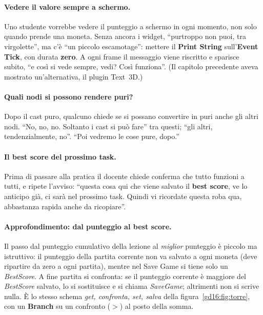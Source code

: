 \paragraph{Vedere il valore sempre a schermo.} Uno studente vorrebbe vedere il
punteggio a schermo in ogni momento, non solo quando prende una moneta. Senza
ancora i widget, ``purtroppo non puoi, tra virgolette'', ma c'è ``un piccolo
escamotage'': mettere il \textbf{Print String} sull'\textbf{Event Tick}, con
durata \textbf{zero}. A ogni frame il messaggio viene riscritto e sparisce
subito, ``e così si vede sempre, vedi? Così funziona''. (Il capitolo
precedente aveva mostrato un'alternativa, il plugin Text~3D.)

\paragraph{Quali nodi si possono rendere puri?} Dopo il cast puro, qualcuno
chiede se si possano convertire in puri anche gli altri nodi. ``No, no, no.
Soltanto i cast si può fare'' tra questi; ``gli altri, tendenzialmente, no''.
``Poi vedremo le cose pure, dopo.''

\paragraph{Il best score del prossimo task.} Prima di passare alla pratica il
docente chiede conferma che tutto funzioni a tutti, e ripete l'avviso: ``questa
cosa qui che viene salvato il \textbf{best score}, ve lo anticipo già, ci sarà
nel prossimo task. Quindi vi ricordate questa roba qua, abbastanza rapida anche
da ricopiare''.

\paragraph{Approfondimento: dal punteggio al best score.} Il passo dal
punteggio cumulativo della lezione al \emph{miglior} punteggio è piccolo ma
istruttivo: il punteggio della partita corrente non va salvato a ogni moneta
(deve ripartire da zero a ogni partita), mentre nel Save Game si tiene solo un
\emph{BestScore}. A fine partita si confronta: se il punteggio corrente è
maggiore del \emph{BestScore} salvato, lo si sostituisce e si chiama
\emph{SaveGame}; altrimenti non si scrive nulla. È lo stesso schema
\emph{get, confronta, set, salva} della figura~\ref{gd16:fig:torre}, con un
\textbf{Branch} su un confronto ($>$) al posto della somma.

